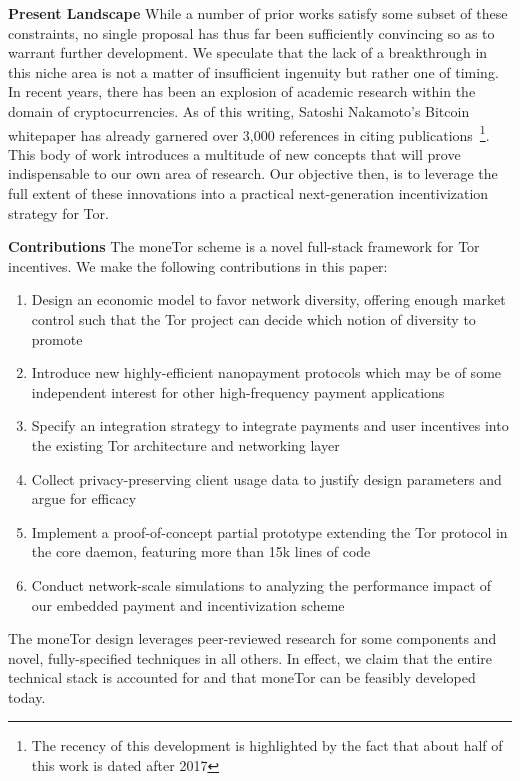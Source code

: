 \textbf{Present Landscape} While a number of prior works satisfy some subset of
these constraints, no single proposal has thus far been sufficiently convincing
so as to warrant further development. We speculate that the lack of a
breakthrough in this niche area is not a matter of insufficient ingenuity but
rather one of timing. In recent years, there has been an explosion of academic
research within the domain of cryptocurrencies. As of this writing, Satoshi
Nakamoto's Bitcoin whitepaper has already garnered over 3,000 references in
citing publications~\cite{nakamoto2008bitcoin}\footnote{The recency of this
  development is highlighted by the fact that about half of this work is dated
  after 2017}. This body of work introduces a multitude of new concepts that
will prove indispensable to our own area of research. Our objective then, is to
leverage the full extent of these innovations into a practical next-generation
incentivization strategy for Tor.

\label{sec:Contributions}
\textbf{Contributions} The moneTor scheme is a novel full-stack framework for
Tor incentives. We make the following contributions in this paper:

\begin{enumerate}
\item Design an economic model to favor network diversity, offering enough
  market control such that the Tor project can decide which notion of diversity
  to promote
\item Introduce new highly-efficient nanopayment protocols which may be of some
  independent interest for other high-frequency payment applications
\item Specify an integration strategy to integrate payments and user incentives
  into the existing Tor architecture and networking layer
\item Collect privacy-preserving client usage data to justify design parameters
  and argue for efficacy
\item Implement a proof-of-concept partial prototype extending the Tor protocol
  in the core daemon, featuring more than 15k lines of code
\item Conduct network-scale simulations to analyzing the performance impact of
  our embedded payment and incentivization scheme
\end{enumerate}

The moneTor design leverages peer-reviewed research for some components and
novel, fully-specified techniques in all others. In effect, we claim that the
entire technical stack is accounted for and that moneTor can be feasibly
developed today.